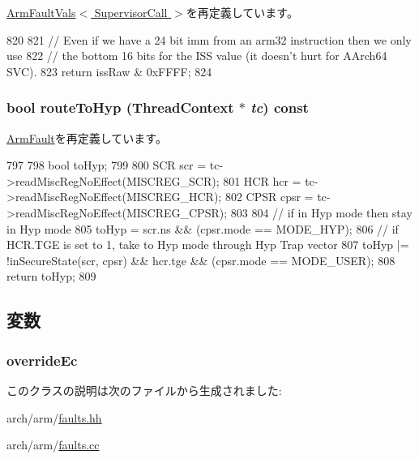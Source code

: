 \hyperlink{classArmISA_1_1ArmFaultVals_a1049bf31f8df10c66994603055cf531d}{ArmFaultVals$<$ SupervisorCall $>$}を再定義しています。


\begin{DoxyCode}
820 {
821     // Even if we have a 24 bit imm from an arm32 instruction then we only use
822     // the bottom 16 bits for the ISS value (it doesn't hurt for AArch64 SVC).
823     return issRaw & 0xFFFF;
824 }
\end{DoxyCode}
\hypertarget{classArmISA_1_1SupervisorCall_a16facd13ba8e6d15d2b865882c379d5f}{
\subsubsection[{routeToHyp}]{\setlength{\rightskip}{0pt plus 5cm}bool routeToHyp ({\bf ThreadContext} $\ast$ {\em tc}) const}}
\label{classArmISA_1_1SupervisorCall_a16facd13ba8e6d15d2b865882c379d5f}


\hyperlink{classArmISA_1_1ArmFault_a6fa7b734487c2a8da04a28ace414a355}{ArmFault}を再定義しています。


\begin{DoxyCode}
797 {
798     bool toHyp;
799 
800     SCR  scr  = tc->readMiscRegNoEffect(MISCREG_SCR);
801     HCR  hcr  = tc->readMiscRegNoEffect(MISCREG_HCR);
802     CPSR cpsr = tc->readMiscRegNoEffect(MISCREG_CPSR);
803 
804     // if in Hyp mode then stay in Hyp mode
805     toHyp  = scr.ns && (cpsr.mode == MODE_HYP);
806     // if HCR.TGE is set to 1, take to Hyp mode through Hyp Trap vector
807     toHyp |= !inSecureState(scr, cpsr) && hcr.tge && (cpsr.mode == MODE_USER);
808     return toHyp;
809 }
\end{DoxyCode}


\subsection{変数}
\hypertarget{classArmISA_1_1SupervisorCall_af5e67d95019a0b5aba4c42205567eda7}{
\subsubsection[{overrideEc}]{ {\bf overrideEc}}}
\label{classArmISA_1_1SupervisorCall_af5e67d95019a0b5aba4c42205567eda7}


このクラスの説明は次のファイルから生成されました:\begin{DoxyCompactItemize}
\item 
arch/arm/\hyperlink{arch_2arm_2faults_8hh}{faults.hh}\item 
arch/arm/\hyperlink{arch_2arm_2faults_8cc}{faults.cc}\end{DoxyCompactItemize}
